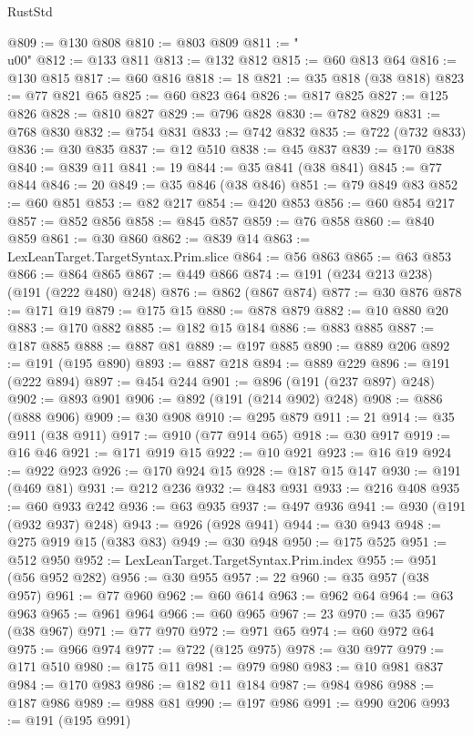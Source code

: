 \begin{lexlean}{RustStd}
\begin{coremodule}
@809 := @130 @808
@810 := @803 @809
@811 := "\\u00"
@812 := @133 @811
@813 := @132 @812
@815 := @60 @813 @64
@816 := @130 @815
@817 := @60 @816
@818 := 18
@821 := @35 @818 (@38 @818)
@823 := @77 @821 @65
@825 := @60 @823 @64
@826 := @817 @825
@827 := @125 @826
@828 := @810 @827
@829 := @796 @828
@830 := @782 @829
@831 := @768 @830
@832 := @754 @831
@833 := @742 @832
@835 := @722 (@732 @833)
@836 := @30 @835
@837 := @12 @510
@838 := @45 @837
@839 := @170 @838
@840 := @839 @11
@841 := 19
@844 := @35 @841 (@38 @841)
@845 := @77 @844
@846 := 20
@849 := @35 @846 (@38 @846)
@851 := @79 @849 @83
@852 := @60 @851
@853 := @82 @217
@854 := @420 @853
@856 := @60 @854 @217
@857 := @852 @856
@858 := @845 @857
@859 := @76 @858
@860 := @840 @859
@861 := @30 @860
@862 := @839 @14
@863 := LexLeanTarget.TargetSyntax.Prim.slice
@864 := @56 @863
@865 := @63 @853
@866 := @864 @865
@867 := @449 @866
@874 := @191 (@234 @213 @238) (@191 (@222 @480) @248)
@876 := @862 (@867 @874)
@877 := @30 @876
@878 := @171 @19
@879 := @175 @15
@880 := @878 @879
@882 := @10 @880 @20
@883 := @170 @882
@885 := @182 @15 @184
@886 := @883 @885
@887 := @187 @885
@888 := @887 @81
@889 := @197 @885
@890 := @889 @206
@892 := @191 (@195 @890)
@893 := @887 @218
@894 := @889 @229
@896 := @191 (@222 @894)
@897 := @454 @244
@901 := @896 (@191 (@237 @897) @248)
@902 := @893 @901
@906 := @892 (@191 (@214 @902) @248)
@908 := @886 (@888 @906)
@909 := @30 @908
@910 := @295 @879
@911 := 21
@914 := @35 @911 (@38 @911)
@917 := @910 (@77 @914 @65)
@918 := @30 @917
@919 := @16 @46
@921 := @171 @919 @15
@922 := @10 @921
@923 := @16 @19
@924 := @922 @923
@926 := @170 @924 @15
@928 := @187 @15 @147
@930 := @191 (@469 @81)
@931 := @212 @236
@932 := @483 @931
@933 := @216 @408
@935 := @60 @933 @242
@936 := @63 @935
@937 := @497 @936
@941 := @930 (@191 (@932 @937) @248)
@943 := @926 (@928 @941)
@944 := @30 @943
@948 := @275 @919 @15 (@383 @83)
@949 := @30 @948
@950 := @175 @525
@951 := @512 @950
@952 := LexLeanTarget.TargetSyntax.Prim.index
@955 := @951 (@56 @952 @282)
@956 := @30 @955
@957 := 22
@960 := @35 @957 (@38 @957)
@961 := @77 @960
@962 := @60 @614
@963 := @962 @64
@964 := @63 @963
@965 := @961 @964
@966 := @60 @965
@967 := 23
@970 := @35 @967 (@38 @967)
@971 := @77 @970
@972 := @971 @65
@974 := @60 @972 @64
@975 := @966 @974
@977 := @722 (@125 @975)
@978 := @30 @977
@979 := @171 @510
@980 := @175 @11
@981 := @979 @980
@983 := @10 @981 @837
@984 := @170 @983
@986 := @182 @11 @184
@987 := @984 @986
@988 := @187 @986
@989 := @988 @81
@990 := @197 @986
@991 := @990 @206
@993 := @191 (@195 @991)

\end{coremodule}
\end{lexlean}
